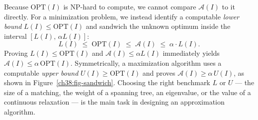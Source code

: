 \begin{intuitionbox}
Because $\mathrm{OPT}(I)$ is \textsf{NP}-hard to compute, we cannot compare $\mathcal{A}(I)$ to it directly.
For a minimization problem, we instead identify a computable \emph{lower bound} $L(I) \le \mathrm{OPT}(I)$
and sandwich the unknown optimum inside the interval $[L(I),\, \alpha L(I)]$:
\[
  L(I) \;\le\; \mathrm{OPT}(I) \;\le\; \mathcal{A}(I) \;\le\; \alpha\cdot L(I).
\]
Proving $L(I) \le \mathrm{OPT}(I)$ and $\mathcal{A}(I) \le \alpha L(I)$ immediately yields
$\mathcal{A}(I) \le \alpha\,\mathrm{OPT}(I)$. Symmetrically, a maximization algorithm uses a computable
\emph{upper bound} $U(I) \ge \mathrm{OPT}(I)$ and proves $\mathcal{A}(I) \ge \alpha\, U(I)$, as shown
in Figure~\ref{ch38:fig-sandwich}. Choosing the right benchmark $L$ or $U$ --- the size of a matching,
the weight of a spanning tree, an eigenvalue, or the value of a continuous relaxation --- is the main
task in designing an approximation algorithm.
\end{intuitionbox}

